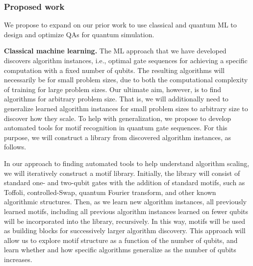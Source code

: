 \documentclass[10pt]{article}
\begin{document}



\subsubsection{Proposed work} We propose to expand on our prior work to use classical and quantum ML to design and optimize QAs for quantum simulation.%


\textbf{Classical machine learning.} The ML approach that we have developed \cite{cincio2018learning} discovers algorithm instances, i.e., optimal gate sequences for achieving a specific computation with a fixed number of qubits. The resulting algorithms will necessarily be for small problem sizes, due to both the computational complexity of training for large problem sizes. Our ultimate aim, however, is to find algorithms for arbitrary problem size. That is, we will additionally need to generalize learned algorithm instances for small problem sizes to arbitrary size to discover how they scale. To help with generalization, we propose to develop automated tools for motif recognition in quantum gate sequences. For this purpose, we will construct a library from discovered algorithm instances, as follows.

In our approach to finding automated tools to help understand algorithm scaling, we will iteratively construct a motif library. Initially, the library will consist of standard one- and two-qubit gates with the addition of standard motifs, such as Toffoli, controlled-Swap, quantum Fourier transform, and other known algorithmic structures. Then, as we learn new algorithm instances, all previously learned motifs, including all previous algorithm instances learned on fewer qubits will be incorporated into the library, recursively. In this way, motifs will be used as building blocks for successively larger algorithm discovery. This approach will allow us to explore motif structure as a function of the number of qubits, and learn whether and how specific algorithms generalize as the number of qubits increases.
\end{document}
